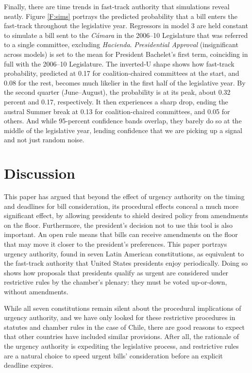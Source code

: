 \documentclass[letter,12pt]{article}
\begin{document}
Finally, there are time trends in fast-track authority that simulations reveal neatly. Figure \ref{F:sims} portrays the predicted probability that a bill enters the fast-track throughout the legislative year. Regressors in model 3 are held constant to simulate a bill sent to the \emph{C\'amara} in the 2006--10 Legislature that was referred to a single committee, excluding \emph{Hacienda}. \emph{Presidential Approval} (insignificant across models) is set to the mean for President Bachelet's first term, coinciding in full with the 2006--10 Legislature. The inverted-U shape shows how fast-track probability, predicted at 0.17 for coalition-chaired committees at the start, and 0.08 for the rest, becomes much likelier in the first half of the legislative year. By the second quarter (June--August), the probability is at its peak, about 0.32 percent and 0.17, respectively. It then experiences a sharp drop, ending the austral Summer break at 0.13 for coalition-chaired committees, and 0.05 for others. And while 95-percent confidence bands overlap, they barely do so at the middle of the legislative year, lending confidence that we are picking up a signal and not just random noise. 

\section*{Discussion}\label{s:discussion}

This paper has argued that beyond the effect of urgency authority on the timing and deadlines for bill consideration, its procedural effects conceal a much more significant effect, by allowing presidents to shield desired policy from amendments on the floor. Furthermore, the president's decision not to use this tool is also important. An open rule means that bills can receive amendments on the floor that may move it closer to the president's preferences. This paper portrays urgency authority, found in seven Latin American constitutions, as equivalent to the fast-track authority that United States presidents enjoy periodically. Doing so shows how proposals that presidents qualify as urgent are considered under restrictive rules by the chamber's plenary: they must be voted up-or-down, without amendments.

While all seven constitutions remain silent about the procedural implications of urgency authority, and we have only looked for these restrictive procedures in statutes and chamber rules in the case of Chile, there are good reasons to expect that other countries have included similar provisions. After all, the rationale of the urgency authority is expediting the legislative process, and restrictive rules are a natural choice to speed urgent bills' consideration before an explicit deadline expires. 
\end{document}

